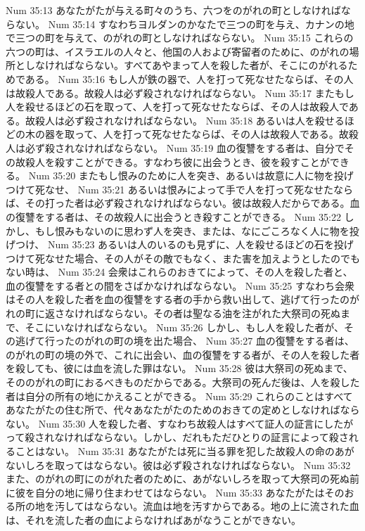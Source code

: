 Num 35:13  あなたがたが与える町々のうち、六つをのがれの町としなければならない。
Num 35:14  すなわちヨルダンのかなたで三つの町を与え、カナンの地で三つの町を与えて、のがれの町としなければならない。
Num 35:15  これらの六つの町は、イスラエルの人々と、他国の人および寄留者のために、のがれの場所としなければならない。すべてあやまって人を殺した者が、そこにのがれるためである。
Num 35:16  もし人が鉄の器で、人を打って死なせたならば、その人は故殺人である。故殺人は必ず殺されなければならない。
Num 35:17  またもし人を殺せるほどの石を取って、人を打って死なせたならば、その人は故殺人である。故殺人は必ず殺されなければならない。
Num 35:18  あるいは人を殺せるほどの木の器を取って、人を打って死なせたならば、その人は故殺人である。故殺人は必ず殺されなければならない。
Num 35:19  血の復讐をする者は、自分でその故殺人を殺すことができる。すなわち彼に出会うとき、彼を殺すことができる。
Num 35:20  またもし恨みのために人を突き、あるいは故意に人に物を投げつけて死なせ、
Num 35:21  あるいは恨みによって手で人を打って死なせたならば、その打った者は必ず殺されなければならない。彼は故殺人だからである。血の復讐をする者は、その故殺人に出会うとき殺すことができる。
Num 35:22  しかし、もし恨みもないのに思わず人を突き、または、なにごころなく人に物を投げつけ、
Num 35:23  あるいは人のいるのも見ずに、人を殺せるほどの石を投げつけて死なせた場合、その人がその敵でもなく、また害を加えようとしたのでもない時は、
Num 35:24  会衆はこれらのおきてによって、その人を殺した者と、血の復讐をする者との間をさばかなければならない。
Num 35:25  すなわち会衆はその人を殺した者を血の復讐をする者の手から救い出して、逃げて行ったのがれの町に返さなければならない。その者は聖なる油を注がれた大祭司の死ぬまで、そこにいなければならない。
Num 35:26  しかし、もし人を殺した者が、その逃げて行ったのがれの町の境を出た場合、
Num 35:27  血の復讐をする者は、のがれの町の境の外で、これに出会い、血の復讐をする者が、その人を殺した者を殺しても、彼には血を流した罪はない。
Num 35:28  彼は大祭司の死ぬまで、そののがれの町におるべきものだからである。大祭司の死んだ後は、人を殺した者は自分の所有の地にかえることができる。
Num 35:29  これらのことはすべてあなたがたの住む所で、代々あなたがたのためのおきての定めとしなければならない。
Num 35:30  人を殺した者、すなわち故殺人はすべて証人の証言にしたがって殺されなければならない。しかし、だれもただひとりの証言によって殺されることはない。
Num 35:31  あなたがたは死に当る罪を犯した故殺人の命のあがないしろを取ってはならない。彼は必ず殺されなければならない。
Num 35:32  また、のがれの町にのがれた者のために、あがないしろを取って大祭司の死ぬ前に彼を自分の地に帰り住まわせてはならない。
Num 35:33  あなたがたはそのおる所の地を汚してはならない。流血は地を汚すからである。地の上に流された血は、それを流した者の血によらなければあがなうことができない。
